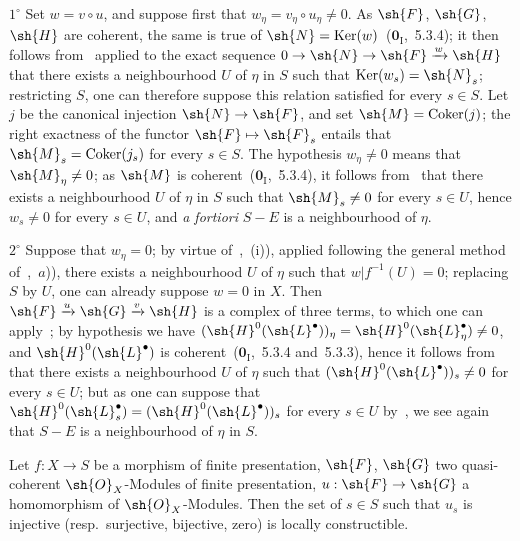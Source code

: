 $1^\circ$ Set $w=v\circ u$, and suppose first that $w_\eta=v_\eta\circ u_\eta\neq 0$.
As $\sh{F}$, $\sh{G}$, $\sh{H}$ are coherent, the same is true of $\sh{N}=\operatorname{Ker}(w)$~($\mathbf{0}_{\mathrm{I}}$,~5.3.4); it then follows from~ applied to the exact sequence $0\to\sh{N}\to\sh{F}\xrightarrow{w}\sh{H}$ that there exists a neighbourhood $U$ of $\eta$ in $S$ such that $\operatorname{Ker}(w_s)=\sh{N}_s$; restricting $S$, one can therefore suppose this relation satisfied for every $s\in S$.
Let $j$ be the canonical injection $\sh{N}\to\sh{F}$, and set $\sh{M}=\operatorname{Coker}(j)$; the right exactness of the functor $\sh{F}\mapsto\sh{F}_s$ entails that $\sh{M}_s=\operatorname{Coker}(j_s)$ for every $s\in S$.
The hypothesis $w_\eta\neq 0$ means that $\sh{M}_\eta\neq 0$; as $\sh{M}$ is coherent~($\mathbf{0}_{\mathrm{I}}$,~5.3.4), it follows from~ that there exists a neighbourhood $U$ of $\eta$ in $S$ such that $\sh{M}_s\neq 0$ for every $s\in U$, hence $w_s\neq 0$ for every $s\in U$, and \emph{a fortiori} $S-E$ is a neighbourhood of $\eta$.

$2^\circ$ Suppose that $w_\eta=0$; by virtue of~,~(i)), applied following the general method of~,~$a$)), there exists a neighbourhood $U$ of $\eta$ such that $w|f^{-1}(U)=0$; replacing $S$ by $U$, one can already suppose $w=0$ in $X$.
Then $\sh{F}\xrightarrow{u}\sh{G}\xrightarrow{v}\sh{H}$ is a complex of three terms, to which one can apply~; by hypothesis we have $(\sh{H}^0(\sh{L}^\bullet))_\eta=\sh{H}^0(\sh{L}^\bullet_\eta)\neq 0$, and $\sh{H}^0(\sh{L}^\bullet)$ is coherent~($\mathbf{0}_{\mathrm{I}}$,~5.3.4 and~5.3.3), hence it follows from~ that there exists a neighbourhood $U$ of $\eta$ such that $(\sh{H}^0(\sh{L}^\bullet))_s\neq 0$ for every $s\in U$; but as one can suppose that $\sh{H}^0(\sh{L}^\bullet_s)=(\sh{H}^0(\sh{L}^\bullet))_s$ for every $s\in U$ by~, we see again that $S-E$ is a neighbourhood of $\eta$ in $S$.


\begin{corollary}[9.4.5]
\label{IV.9.4.5}
Let $f:X\to S$ be a morphism of finite presentation, $\sh{F}$, $\sh{G}$ two quasi-coherent $\sh{O}_X$-Modules of finite presentation, $u:\sh{F}\to\sh{G}$ a homomorphism of $\sh{O}_X$-Modules.
Then the set of $s\in S$ such that $u_s$ is injective \textnormal{(}resp.\ surjective, bijective, zero\textnormal{)} is locally constructible.
\end{corollary}


